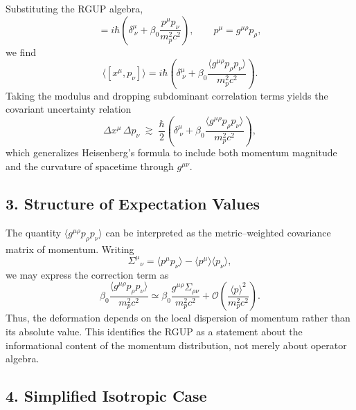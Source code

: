 \documentclass[11pt,oneside]{book}
\numberwithin{equation}{chapter}
\newcommand{\mpx}{m_p}               %
\newcommand{\betaz}{\beta_0}
\begin{document}
Substituting the RGUP algebra,
\begin{equation}
[x^\mu,p_\nu]=i\hbar
\left(\delta^\mu_{\ \nu}
+ \betaz\frac{p^\mu p_\nu}{\mpx^2 c^2}\right),
\qquad p^\mu=g^{\mu\rho}p_\rho,
\end{equation}
we find
\begin{equation}
\langle[x^\mu,p_\nu]\rangle
=i\hbar
\left(\delta^\mu_{\ \nu}
+ \betaz\frac{\langle g^{\mu\rho}p_\rho p_\nu\rangle}{\mpx^2 c^2}\right).
\end{equation}
Taking the modulus and dropping subdominant correlation terms yields the
covariant uncertainty relation
\begin{equation}
\Delta x^\mu\,\Delta p_\nu
\;\gtrsim\;
\frac{\hbar}{2}\left(
\delta^\mu_{\ \nu}
+ \betaz \frac{\langle g^{\mu\rho}p_\rho p_\nu\rangle}{\mpx^2 c^2}
\right),
\label{eq:rgup_uncertainty}
\end{equation}
which generalizes Heisenberg’s formula to include both momentum magnitude
and the curvature of spacetime through $g^{\mu\nu}$.

\subsection*{3. Structure of Expectation Values}

The quantity $\langle g^{\mu\rho}p_\rho p_\nu\rangle$
can be interpreted as the metric--weighted covariance matrix of momentum.
Writing
\begin{equation}
\Sigma^{\mu}{}_{\nu}
= \langle p^\mu p_\nu\rangle
  - \langle p^\mu\rangle\langle p_\nu\rangle,
\end{equation}
we may express the correction term as
\begin{equation}
\betaz \frac{\langle g^{\mu\rho}p_\rho p_\nu\rangle}{\mpx^2 c^2}
\simeq
\betaz \frac{g^{\mu\rho}\Sigma_{\rho\nu}}{\mpx^2 c^2}
+\mathcal{O}\!\left(\frac{\langle p\rangle^2}{\mpx^2 c^2}\right).
\end{equation}
Thus, the deformation depends on the local dispersion of momentum rather than
its absolute value.  
This identifies the RGUP as a statement about the informational content
of the momentum distribution, not merely about operator algebra.

\subsection*{4. Simplified Isotropic Case}
\end{document}
